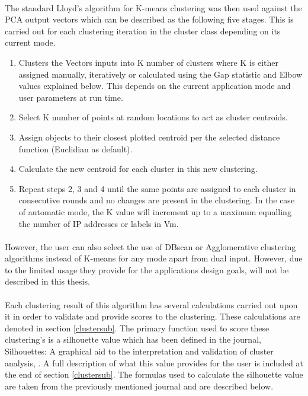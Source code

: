 \paragraph{}The standard Lloyd's algorithm for K-means clustering was then used against the PCA output vectors which can be described as the following five stages. This is carried out for each clustering iteration in the cluster class depending on its current mode.

\begin{enumerate}
\item Clusters the Vectors inputs into K number of clusters where K is either assigned manually, iteratively or calculated using the Gap statistic and Elbow values explained below. This depends on the current application mode and user parameters at run time.
\item  Select K number of points at random locations to act as cluster centroids.
\item  Assign objects to their closest plotted centroid per the selected distance function (Euclidian as default).
\item Calculate the new centroid for each cluster in this new clustering.
\item Repeat steps 2, 3 and 4 until the same points are assigned to each cluster in consecutive rounds and no changes are present in the clustering. In the case of automatic mode, the K value will increment up to a maximum equalling the number of IP addresses or labels in Vm.
\end{enumerate}

\paragraph{}However, the user can also select the use of DBscan or Agglomerative clustering algorithms instead of K-means for any mode apart from dual input. However, due to the limited usage they provide for the applications design goals, will not be described in this thesis. 

\paragraph{}Each clustering result of this algorithm has several calculations carried out upon it in order to validate and provide scores to the clustering. These calculations are denoted in section \ref{clustersub}. The primary function used to score these clustering's is a silhouette value which has been defined in the journal, Silhouettes: A graphical aid to the interpretation and validation of cluster analysis, \cite{silhouette}. A full description of what this value provides for the user is included at the end of section \ref{clustersub}. The formulas used to calculate the silhouette value are taken from the previously mentioned journal and are described below.

